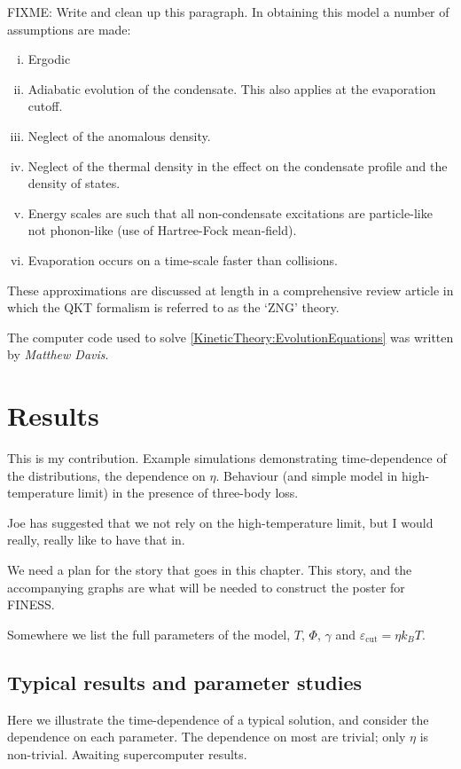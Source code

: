 FIXME: Write and clean up this paragraph. In obtaining this model a number of assumptions are made:
\begin{enumerate}[(i)]
    \item Ergodic
    \item Adiabatic evolution of the condensate. This also applies at the evaporation cutoff.
    \item Neglect of the anomalous density.
    \item Neglect of the thermal density in the effect on the condensate profile and the density of states.
    \item Energy scales are such that all non-condensate excitations are particle-like not phonon-like (use of Hartree-Fock mean-field).
    \item Evaporation occurs on a time-scale faster than collisions.
\end{enumerate}
These approximations are discussed at length in a comprehensive review article \citep{Proukakis:2008} in which the QKT formalism is referred to as the `ZNG' theory.

The computer code used to solve \eqref{KineticTheory:EvolutionEquations} was written by \emph{Matthew Davis}.

\section{Results}
\label{KineticTheory:Results}
This is my contribution. Example simulations demonstrating time-dependence of the distributions, the dependence on $\eta$. Behaviour (and simple model in high-temperature limit) in the presence of three-body loss.

Joe has suggested that we not rely on the high-temperature limit, but I would really, really like to have that in.

We need a plan for the story that goes in this chapter. This story, and the accompanying graphs are what will be needed to construct the poster for FINESS.

Somewhere we list the full parameters of the model, $T$, $\Phi$, $\gamma$ and $\varepsilon_\text{cut} = \eta k_B T$.

\subsection{Typical results and parameter studies}
Here we illustrate the time-dependence of a typical solution, and consider the dependence on each parameter. The dependence on most are trivial; only $\eta$ is non-trivial. Awaiting supercomputer results.



